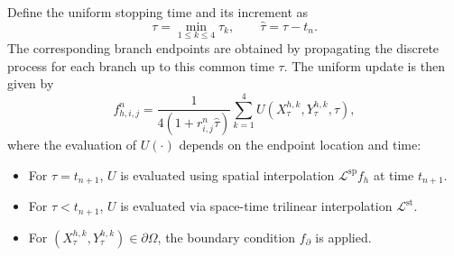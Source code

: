 \documentclass[11pt]{article}
\theoremstyle{mythm}
\theoremstyle{definition}
\begin{document}
	Define the uniform stopping time and its increment as
	\[
	\tau = \min_{1 \le k \le 4} \tau_k, \qquad \hat{\tau} = \tau - t_n.
	\]
	The corresponding branch endpoints are obtained by propagating the discrete process for each branch up to this common time $\tau$. The uniform update is then given by
	\begin{equation}\label{eq:symmetric}
		f_{h,i,j}^{n} = \frac{1}{4(1 + r_{i,j}^n \hat{\tau})} \sum_{k=1}^{4} U\left(X_{\tau}^{h,k}, Y_{\tau}^{h,k}, \tau\right),
	\end{equation}
	where the evaluation of $U(\cdot)$ depends on the endpoint location and time:
	\begin{itemize}
		\item For $\tau=t_{n+1}$, $U$ is evaluated using spatial interpolation $\mathcal{L}^{\mathrm{sp}}f_h$ at time $t_{n+1}$.
		\item For $\tau < t_{n+1}$, $U$ is evaluated via space-time trilinear interpolation $\mathcal{L}^{\mathrm{st}}$.
		\item For $(X_{\tau}^{h,k}, Y_{\tau}^{h,k}) \in \partial\Omega$, the boundary condition $f_{\partial}$ is applied.
	\end{itemize}
	
\end{document}
